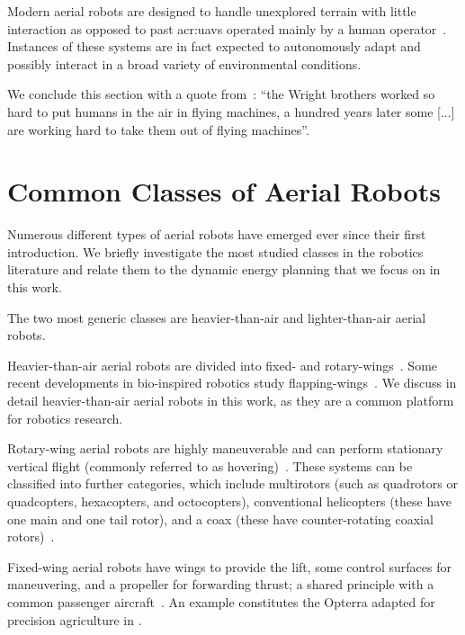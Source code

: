 Modern aerial robots are designed to handle unexplored terrain with little interaction as opposed to past \Gls{acr:uav}s operated mainly by a human operator~\citep{siciliano2016springer}. Instances of these systems are in fact expected to autonomously adapt and possibly interact in a broad variety of environmental conditions. 

We conclude this section with a quote from~\citep{anderson2005introduction}: ``the Wright brothers worked so hard to put humans in the air in flying machines, a hundred years later some [...] are working hard to take them out of flying machines''.


\section{Common Classes of Aerial Robots}
\label{sec:aerial-robo-types}

Numerous different types of aerial robots have emerged ever since their first introduction. We briefly investigate the most studied classes in the robotics literature and relate them to the dynamic energy planning that we focus on in this work. 

The two most generic classes are heavier-than-air and lighter-than-air aerial robots.

Heavier-than-air aerial robots are divided into fixed- and rotary-wings~\citep{siciliano2016springer}. Some recent developments in bio-inspired robotics study flapping-wings~\citep{floreano2015science}. We discuss in detail heavier-than-air aerial robots in this work, as they are a common platform for robotics research. 

Rotary-wing aerial robots are highly maneuverable and can perform stationary vertical flight (commonly referred to as hovering)~\citep{siciliano2016springer}. These systems can be classified into further categories, which include multirotors (such as quadrotors or quadcopters, hexacopters, and octocopters), conventional helicopters (these have one main and one tail rotor), and a coax (these have counter-rotating coaxial rotors)~\citep{corke2017robotics}.

Fixed-wing aerial robots have wings to provide the lift, some control surfaces for maneuvering, and a propeller for forwarding thrust; a shared principle with a common passenger aircraft~\citep{corke2017robotics}. An example constitutes the Opterra adapted for precision agriculture in .

